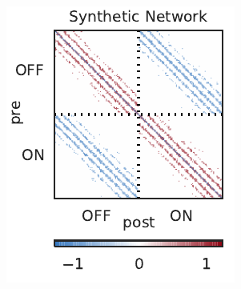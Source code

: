 \begin{figure}[t!]
  \centering
  \vspace{-.2in}
  \begin{subfigure}[b]{1.8in}
    \centering
    \caption{}
    \vspace{-.25in}
    \includegraphics[width=\textwidth]{figures/ch3/synth_rgc_true_conn.pdf}
    \label{fig:synth_rgc_true_conn}
  \end{subfigure}
  ~
  \begin{subfigure}[b]{1.8in}
    \centering
    \caption{}
    \vspace{-.25in}

\end{subfigure}
\end{figure}
